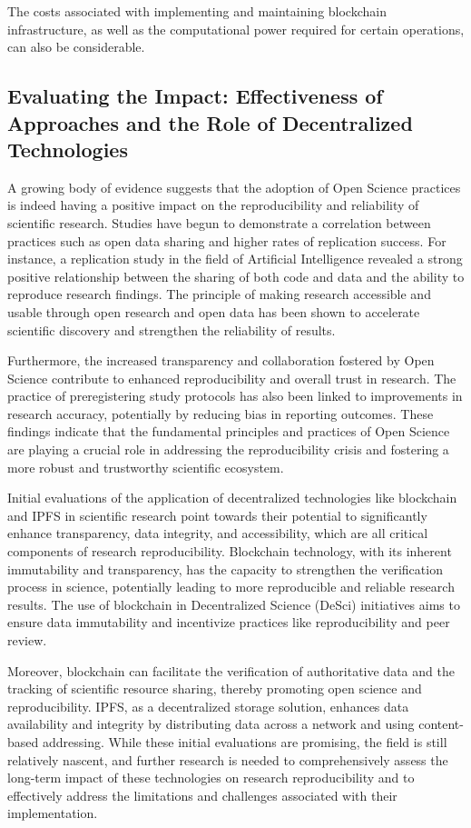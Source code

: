 The costs associated with implementing and maintaining blockchain infrastructure, as well as the computational power required for certain operations, can also be considerable.

\subsection{Evaluating the Impact: Effectiveness of Approaches and the Role of Decentralized Technologies}

A growing body of evidence suggests that the adoption of Open Science practices is indeed having a positive impact on the reproducibility and reliability of scientific research. Studies have begun to demonstrate a correlation between practices such as open data sharing and higher rates of replication success. For instance, a replication study in the field of Artificial Intelligence revealed a strong positive relationship between the sharing of both code and data and the ability to reproduce research findings. The principle of making research accessible and usable through open research and open data has been shown to accelerate scientific discovery and strengthen the reliability of results.

Furthermore, the increased transparency and collaboration fostered by Open Science contribute to enhanced reproducibility and overall trust in research. The practice of preregistering study protocols has also been linked to improvements in research accuracy, potentially by reducing bias in reporting outcomes. These findings indicate that the fundamental principles and practices of Open Science are playing a crucial role in addressing the reproducibility crisis and fostering a more robust and trustworthy scientific ecosystem.

Initial evaluations of the application of decentralized technologies like blockchain and IPFS in scientific research point towards their potential to significantly enhance transparency, data integrity, and accessibility, which are all critical components of research reproducibility. Blockchain technology, with its inherent immutability and transparency, has the capacity to strengthen the verification process in science, potentially leading to more reproducible and reliable research results. The use of blockchain in Decentralized Science (DeSci) initiatives aims to ensure data immutability and incentivize practices like reproducibility and peer review.

Moreover, blockchain can facilitate the verification of authoritative data and the tracking of scientific resource sharing, thereby promoting open science and reproducibility. IPFS, as a decentralized storage solution, enhances data availability and integrity by distributing data across a network and using content-based addressing. While these initial evaluations are promising, the field is still relatively nascent, and further research is needed to comprehensively assess the long-term impact of these technologies on research reproducibility and to effectively address the limitations and challenges associated with their implementation.

